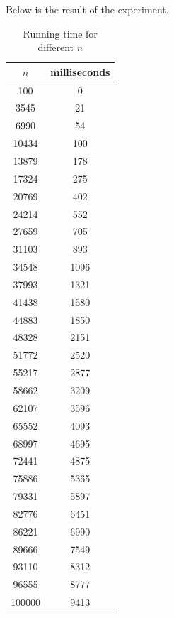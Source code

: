\documentclass[10pt]{article}
\begin{document}
Below is the result of the experiment.

\begin{table}[H]
  \centering
  \caption{Running time for different $n$}
  \label{tab:csv_data}
  \begin{tabular}{cc}
    \hline
    \textbf{$n$} & \textbf{milliseconds} \\
    \hline
    100          & 0                     \\
    3545         & 21                    \\
    6990         & 54                    \\
    10434        & 100                   \\
    13879        & 178                   \\
    17324        & 275                   \\
    20769        & 402                   \\
    24214        & 552                   \\
    27659        & 705                   \\
    31103        & 893                   \\
    34548        & 1096                  \\
    37993        & 1321                  \\
    41438        & 1580                  \\
    44883        & 1850                  \\
    48328        & 2151                  \\
    51772        & 2520                  \\
    55217        & 2877                  \\
    58662        & 3209                  \\
    62107        & 3596                  \\
    65552        & 4093                  \\
    68997        & 4695                  \\
    72441        & 4875                  \\
    75886        & 5365                  \\
    79331        & 5897                  \\
    82776        & 6451                  \\
    86221        & 6990                  \\
    89666        & 7549                  \\
    93110        & 8312                  \\
    96555        & 8777                  \\
    100000       & 9413                  \\
    \hline
  \end{tabular}
\end{table}
\end{document}
